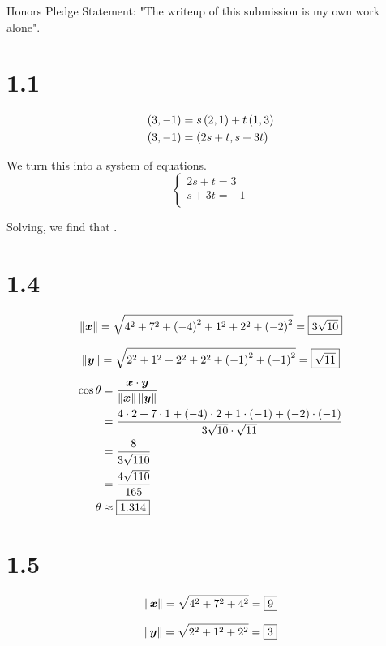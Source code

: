 \documentclass{article}
\begin{document}
Honors Pledge Statement: "The writeup of this submission is my own work alone".

\section*{1.1}

\begin{align*}
  \left ( 3, -1 \right) &= s \left ( 2, 1 \right) + t \left ( 1, 3 \right) \\
  \left ( 3, -1 \right) &= \left ( 2s+t, s+3t \right) \\
\end{align*}

We turn this into a system of equations.
$$
\begin{cases}
  2s + t = 3 \\
  s+3t = -1 \\
\end{cases}
$$

Solving, we find that .


\section*{1.4}

$$\left\lVert\bm{x}\right\rVert = \sqrt{4^2 + 7^2 + \left ( -4 \right)^2 + 1^2 + 2^2 + \left ( -2 \right)^2} =  \boxed{3 \sqrt{10}}$$

$$\left\lVert\bm{y}\right\rVert = \sqrt{2^2 + 1^2 + 2^2 + 2^2 + \left ( -1 \right)^2 + \left ( -1 \right)^2} = \boxed{\sqrt{11}}$$

\begin{align*}
  \cos \theta &= \frac{\bm{x} \cdot \bm{y}}{\left\lVert\bm{x}\right\rVert \left\lVert\bm{y}\right\rVert} \\
              &= \frac{4 \cdot 2 + 7 \cdot 1 + \left ( -4 \right) \cdot 2 + 1 \cdot \left ( -1 \right) + \left ( -2 \right) \cdot \left ( -1 \right)}{3 \sqrt{10} \cdot \sqrt{11}} \\
              &= \frac{8}{3 \sqrt{110}} \\
              &= \frac{4 \sqrt{110}}{165} \\
  \theta & \approx \boxed{1.314} \\
\end{align*}


\section*{1.5}

$$\left\lVert\bm{x}\right\rVert = \sqrt{4^2 + 7^2 + 4^2} =  \boxed{9}$$

$$\left\lVert\bm{y}\right\rVert = \sqrt{2^2 + 1^2 + 2^2} =  \boxed{3}$$
\end{document}
